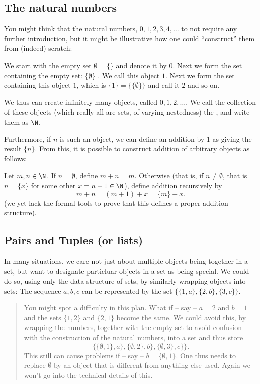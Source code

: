 \subsection{The natural numbers}

\bonussection
You might think
that the natural numbers, $0,1,2,3,4,\ldots$ to not require any further
introduction, but it might be illustrative how one could ``construct'' them
from (indeed) scratch:

We start with the empty set $\emptyset=\{\}$ and
denote it by $0$. Next we form the set containing the empty set:
$\{\emptyset\}$ . We call this object $1$. Next we form the set containing this
object $1$, which is $\{1\}=\{\{\emptyset\}\}$ and call it $2$ and so on.

We thus can create infinitely many objects, called $0,1,2,\ldots$. We call the
collection of these objects (which really all are sets, of varying nestedness) the
, and write them as $\N$.

Furthermore, if $n$
is such an object, we can define an addition by 1 as giving the result $\{n\}$. From
this, it is possible to construct addition of arbitrary objects as follows:

Let $m,n\in\N$. If $n=\emptyset$, define $m+n=m$. Otherwise (that is, if
$n\not=\emptyset$, that is $n=\{x\}$ for some other $x=n-1\in\N$), define addition
recursively by
\[
m+n=(m+1)+x=\{m\}+x.
\]
(we yet lack the formal tools to prove that this defines a proper addition structure).

\subsection{Pairs and Tuples (or lists)}

In many situations, we care not just about multiple objects being together in a set,
but want to designate particluar objects in a set as
being special. We could do so, using only the data structure of sets, by similarly
wrapping objects into sets: The sequence $a,b,c$ can be represented by the set
$\{\{1,a\},\{2,b\},\{3,c\}\}$.

\begin{quote}
\bonussection
You might spot a difficulty in this plan. What if -- say -- $a=2$ and $b=1$ and the
sets $\{1,2\}$ and $\{2,1\}$ become the same. We could avoid this, by wrapping the
numbers, together with the empty set to avoid confusion with the construction of the
natural numbers, into a set and thus store
\[
\{\{\emptyset,1\},a\},\{\emptyset,2\},b\},\{\emptyset,3\},c\}\}.
\]
This still can cause problems if -- say -- $b=\{\emptyset,1\}$. One thus needs to
replace $\emptyset$ by an object that is different from anything else used. Again we
won't go into the technical details of this.
\end{quote}

